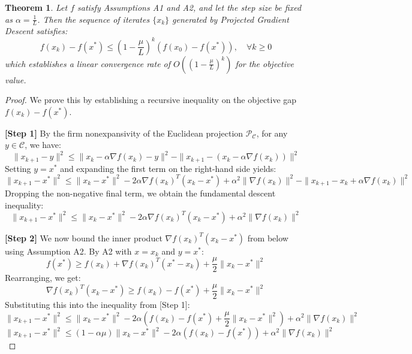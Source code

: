 \documentclass[11pt]{article}
\newtheorem{theorem}{Theorem}
\begin{document}
\begin{theorem}
Let $f$ satisfy Assumptions A1 and A2, and let the step size be fixed as $\alpha = \frac{1}{L}$. Then the sequence of iterates $\{x_k\}$ generated by Projected Gradient Descent satisfies:
\[ f(x_k) - f(x^*) \leq \left(1 - \frac{\mu}{L}\right)^k \left( f(x_0) - f(x^*) \right), \quad \forall k \geq 0 \]
which establishes a linear convergence rate of $O\left(\left(1 - \frac{\mu}{L}\right)^k\right)$ for the objective value.
\end{theorem}

\begin{proof}
We prove this by establishing a recursive inequality on the objective gap $f(x_k) - f(x^*)$.

\textbf{[Step 1]} By the firm nonexpansivity of the Euclidean projection $\mathcal{P}_{\mathcal{C}}$, for any $y \in \mathcal{C}$, we have:
\[ \|x_{k+1} - y\|^2 \leq \|x_k - \alpha \nabla f(x_k) - y\|^2 - \|x_{k+1} - (x_k - \alpha \nabla f(x_k))\|^2 \]
Setting $y = x^*$ and expanding the first term on the right-hand side yields:
\[ \|x_{k+1} - x^*\|^2 \leq \|x_k - x^*\|^2 - 2\alpha \nabla f(x_k)^T (x_k - x^*) + \alpha^2 \|\nabla f(x_k)\|^2 - \|x_{k+1} - x_k + \alpha \nabla f(x_k)\|^2 \]
Dropping the non-negative final term, we obtain the fundamental descent inequality:
\[ \|x_{k+1} - x^*\|^2 \leq \|x_k - x^*\|^2 - 2\alpha \nabla f(x_k)^T (x_k - x^*) + \alpha^2 \|\nabla f(x_k)\|^2 \]

\textbf{[Step 2]} We now bound the inner product $\nabla f(x_k)^T (x_k - x^*)$ from below using Assumption A2. By A2 with $x = x_k$ and $y = x^*$:
\[ f(x^*) \geq f(x_k) + \nabla f(x_k)^T (x^* - x_k) + \frac{\mu}{2} \|x_k - x^*\|^2 \]
Rearranging, we get:
\[ \nabla f(x_k)^T (x_k - x^*) \geq f(x_k) - f(x^*) + \frac{\mu}{2} \|x_k - x^*\|^2 \]
Substituting this into the inequality from [Step 1]:
\[ \|x_{k+1} - x^*\|^2 \leq \|x_k - x^*\|^2 - 2\alpha \left( f(x_k) - f(x^*) + \frac{\mu}{2} \|x_k - x^*\|^2 \right) + \alpha^2 \|\nabla f(x_k)\|^2 \]
\[ \|x_{k+1} - x^*\|^2 \leq (1 - \alpha \mu) \|x_k - x^*\|^2 - 2\alpha (f(x_k) - f(x^*)) + \alpha^2 \|\nabla f(x_k)\|^2 \]


\end{proof}
\end{document}
